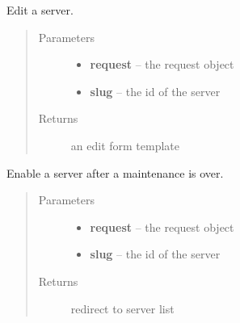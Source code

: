 \documentclass[letterpaper,10pt,english]{sphinxmanual}
\begin{document}

\begin{fulllineitems}
\label{api/cluster:limeade.cluster.views.server_edit}
Edit a server.
\begin{quote}\begin{description}
\item[{Parameters}] \leavevmode\begin{itemize}
\item {} 
\textbf{request} -- the request object

\item {} 
\textbf{slug} -- the id of the server

\end{itemize}

\item[{Returns}] \leavevmode
an edit form template

\end{description}\end{quote}

\end{fulllineitems}


\begin{fulllineitems}
\label{api/cluster:limeade.cluster.views.server_enable}
Enable a server after a maintenance is over.
\begin{quote}\begin{description}
\item[{Parameters}] \leavevmode\begin{itemize}
\item {} 
\textbf{request} -- the request object

\item {} 
\textbf{slug} -- the id of the server

\end{itemize}

\item[{Returns}] \leavevmode
redirect to server list

\end{description}\end{quote}

\end{fulllineitems}
\end{document}
